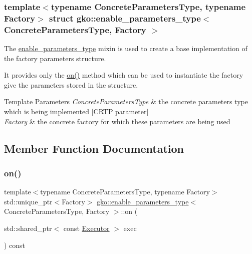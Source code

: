 \subsubsection*{template$<$typename Concrete\+Parameters\+Type, typename Factory$>$\newline
struct gko\+::enable\+\_\+parameters\+\_\+type$<$ Concrete\+Parameters\+Type, Factory $>$}

The \hyperlink{structgko_1_1enable__parameters__type}{enable\+\_\+parameters\+\_\+type} mixin is used to create a base implementation of the factory parameters structure. 

It provides only the \hyperlink{structgko_1_1enable__parameters__type_a07bc1963e83201576761e013f22ce621}{on()} method which can be used to instantiate the factory give the parameters stored in the structure.


\begin{DoxyTemplParams}{Template Parameters}
{\em Concrete\+Parameters\+Type} & the concrete parameters type which is being implemented \mbox{[}C\+R\+TP parameter\mbox{]} \\
\hline
{\em Factory} & the concrete factory for which these parameters are being used \\
\hline
\end{DoxyTemplParams}


\subsection{Member Function Documentation}
\mbox{\label{structgko_1_1enable__parameters__type_a07bc1963e83201576761e013f22ce621}} 
\subsubsection{\texorpdfstring{on()}{on()}}
{\footnotesize\ttfamily template$<$typename Concrete\+Parameters\+Type, typename Factory$>$ \\
std\+::unique\+\_\+ptr$<$Factory$>$ \hyperlink{structgko_1_1enable__parameters__type}{gko\+::enable\+\_\+parameters\+\_\+type}$<$ Concrete\+Parameters\+Type, Factory $>$\+::on (\begin{DoxyParamCaption}\item[{std\+::shared\+\_\+ptr$<$ const \hyperlink{classgko_1_1Executor}{Executor} $>$}]{exec }\end{DoxyParamCaption}) const}



